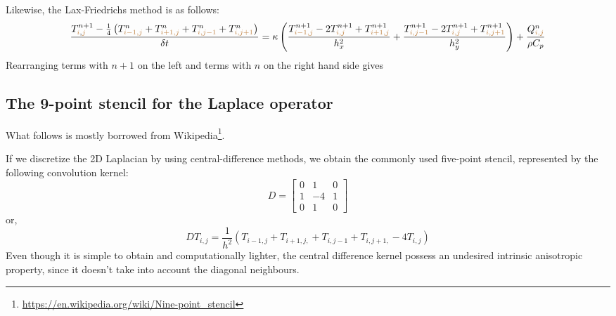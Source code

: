 Likewise, the Lax-Friedrichs method is as follows:
\begin{equation}
\frac{T_{{\color{brown}i},{\color{brown}j}}^{n+1}-
\frac{1}{4} \left(  
T_{{\color{brown}i-1,j}}^{n}  +
T_{{\color{brown}i+1,j}}^{n}  +
T_{{\color{brown}i,j-1}}^{n}  +
T_{{\color{brown}i,j+1}}^{n}  
\right)
}{\delta t}
= \kappa
\left(
\frac{ T_{{\color{brown}i-1,j}}^{n+1}-2T_{{\color{brown}i,j}}^{n+1}+T_{{\color{brown}i+1,j}}^{n+1} }{h_x^2} + 
\frac{ T_{{\color{brown}i,j-1}}^{n+1}-2T_{{\color{brown}i,j}}^{n+1}+T_{{\color{brown}i,j+1}}^{n+1} }{h_y^2}
\right)
+\frac{Q_{{\color{brown}i,j}}^n}{\rho C_p}
\end{equation}
Rearranging terms with $n+1$ on the left and terms with $n$ on the right hand side gives








\subsection{The 9-point stencil for the Laplace operator} \label{ss:ninepointstencil}

What follows is mostly borrowed from Wikipedia\footnote{\url{https://en.wikipedia.org/wiki/Nine-point_stencil}}.

If we discretize the 2D Laplacian by using central-difference methods, we obtain the commonly used five-point stencil, represented by the following convolution kernel: 
\[
D=
\left[
\begin{array}{ccc}
0 & 1 & 0 \\
1 & -4 & 1 \\
0 & 1 & 0 
\end{array}
\right]
\]
or,
\[
D T_{i,j} = \frac{1}{h^2} (T_{i-1,j} + T_{i+1,j,} +  T_{i,j-1} + T_{i,j+1,} -4T_{i,j} )
\]
Even though it is simple to obtain and computationally lighter, the central difference kernel possess an undesired intrinsic anisotropic property, since it doesn't take into account the diagonal neighbours.

